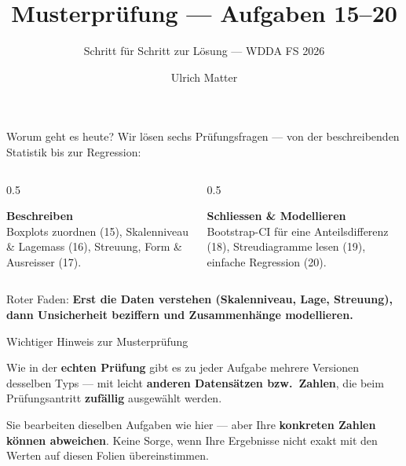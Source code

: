 \documentclass[aspectratio=169,11pt]{beamer}
\title{Musterprüfung --- Aufgaben 15--20}
\subtitle{Schritt für Schritt zur Lösung --- WDDA FS 2026}
\author{Ulrich Matter}
\date{}
\institute{Berner Fachhochschule --- Datenmanagement und Datenanalyse}
\begin{document}
\frame{\titlepage}

\begin{frame}{Worum geht es heute?}
Wir lösen \alert{sechs Prüfungsfragen} --- von der beschreibenden Statistik
bis zur Regression:

\vspace{0.3cm}
\begin{columns}[T]
\begin{column}{0.5\textwidth}
  \begin{konzept}[Fragen 15--17]
  \textbf{Beschreiben}\\[2pt]
  Boxplots zuordnen (15), Skalenniveau \& Lagemass (16), Streuung, Form
  \& Ausreisser (17).
  \end{konzept}
\end{column}
\begin{column}{0.5\textwidth}
  \begin{konzept}[Fragen 18--20]
  \textbf{Schliessen \& Modellieren}\\[2pt]
  Bootstrap-CI für eine Anteilsdifferenz (18), Streudiagramme lesen (19),
  einfache Regression (20).
  \end{konzept}
\end{column}
\end{columns}

\vspace{0.3cm}
Roter Faden: \textbf{Erst die Daten verstehen (Skalenniveau, Lage,
Streuung), dann Unsicherheit beziffern und Zusammenhänge modellieren.}
\end{frame}

\begin{frame}{Wichtiger Hinweis zur Musterprüfung}
\begin{warnung}
Wie in der \textbf{echten Prüfung} gibt es zu jeder Aufgabe \alert{mehrere
Versionen} desselben Typs --- mit leicht \textbf{anderen Datensätzen bzw.\
Zahlen}, die beim Prüfungsantritt \textbf{zufällig} ausgewählt werden.
\end{warnung}

\vspace{0.2cm}
Sie bearbeiten dieselben Aufgaben wie hier --- aber Ihre \textbf{konkreten
Zahlen können abweichen}. \alert{Keine Sorge}, wenn Ihre Ergebnisse nicht
exakt mit den Werten auf diesen Folien übereinstimmen.
\end{frame}
\end{document}
